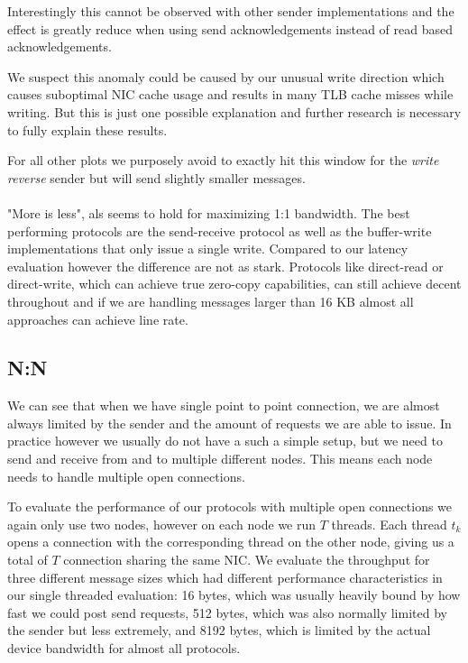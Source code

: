Interestingly this cannot be observed with other sender implementations and the effect is greatly
reduce when using send acknowledgements instead of read based acknowledgements.

We suspect this anomaly could be caused by our unusual write direction which causes suboptimal NIC cache usage and 
results in many TLB cache misses while writing. But this is just one possible explanation and further research is 
necessary to fully explain these results.

For all other plots we purposely avoid to exactly hit this window for the \emph{write reverse}
sender but will send slightly smaller messages.


\paragraph{}"More is less", als seems to hold for maximizing 1:1 bandwidth. The best performing protocols are the send-receive 
protocol as well as the buffer-write implementations that only issue a single write. Compared to our latency evaluation
however the difference are not as stark. 
Protocols like direct-read or direct-write, which can achieve true zero-copy capabilities, can still achieve decent 
throughout and if we are handling messages larger than 16 KB almost all approaches can achieve line rate.








\pagebreak
\subsection{N:N}


We can see that when we have single point to point connection, we are almost always limited by the sender and the 
amount of requests we are able to issue. In practice however we usually do not have a such a simple setup, but we
need to send and receive from and to multiple different nodes. This means each node needs to handle multiple open
connections. 

To evaluate the performance of our protocols with multiple open connections we again only use two nodes, however  
on each node we run $T$ threads. Each thread $t_k$ opens a connection with the corresponding 
thread on the other node, giving us a total of $T$ connection sharing the same NIC. We evaluate the throughput for 
three different message sizes which had different performance characteristics in our single threaded evaluation: 16 bytes, 
which was usually heavily bound by how fast we could post send requests, 512 bytes, which was also normally limited by the 
sender but less extremely, and 8192 bytes, which is limited by the actual device bandwidth for almost all protocols. 

